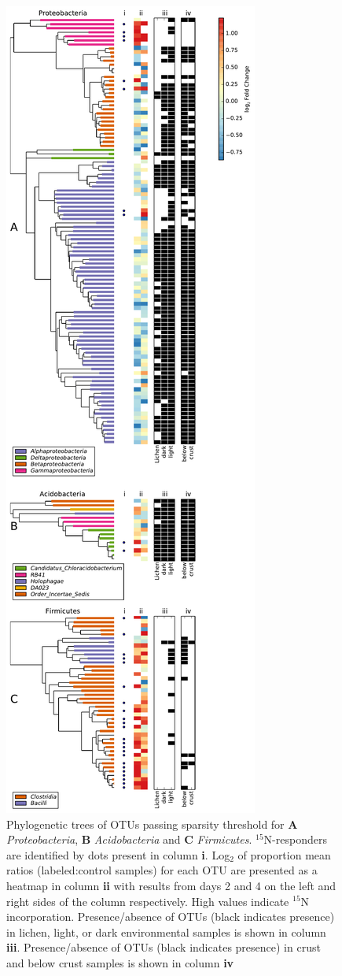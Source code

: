 \begin{figure}[H]
  \centering
  \caption{Phylogenetic trees of OTUs passing sparsity threshold for \textbf{A}
  \textit{Proteobacteria}, \textbf{B} \textit{Acidobacteria} and \textbf{C}
  \textit{Firmicutes}. $^{15}$N-responders are identified by dots present in
  column \textbf{i}. Log$_{2}$ of proportion mean ratios (labeled:control
  samples) for each OTU are presented as a heatmap in column \textbf{ii} with
  results from days 2 and 4 on the left and right sides of the column
  respectively. High values indicate $^{15}$N incorporation. Presence/absence
  of OTUs (black indicates presence) in lichen, light, or dark environmental
  samples \citep{Garcia_Pichel_2013} is shown in column \textbf{iii}.
  Presence/absence of OTUs (black indicates presence) in crust and below crust
  samples \citep{Steven_2013} is shown in column \textbf{iv}}
  \includegraphics[height=0.95\textheight]{figures/trees/trees.pdf}

\end{figure}
